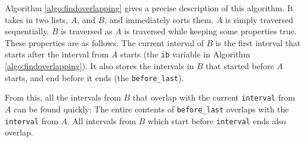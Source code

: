 \documentclass[12pt,twoside]{reedthesis}
\begin{document}
			Algorithm \ref{algo:findoverlapping} gives a precise description of this algorithm. It takes in two lists, $A$, and $B$, and immediately sorts them. $A$ is simply traversed sequentially. $B$ is traversed as $A$ is traversed while keeping some properties true. These properties are as follows. The current interval of $B$ is the first interval that starts after the interval from $A$ starts (the \texttt{ib} variable in Algorithm \ref{algo:findoverlapping}). It also stores the intervals in $B$ that started before $A$ starts, and end before it ends (the \texttt{before\_last}).
			
		 	From this, all the intervals from $B$ that overlap with the current \texttt{interval} from $A$ can be found quickly: The entire contents of \texttt{before\_last} overlaps with the \texttt{interval} from $A$. All intervals from $B$ which start before \texttt{interval} ends also overlap.
			
			
                    
\end{document}
